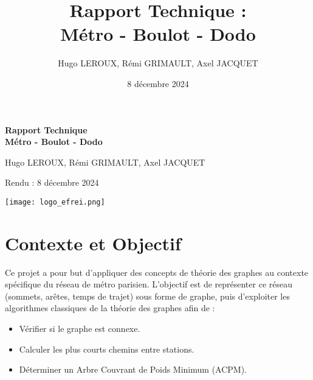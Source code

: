 \documentclass[a4paper,12pt]{article}
\title{Rapport Technique :\\ Métro - Boulot - Dodo}
\author{Hugo LEROUX, Rémi GRIMAULT, Axel JACQUET}
\date{8 décembre 2024}
\begin{document}
\begin{titlepage}
    \thispagestyle{empty} %
    \begin{center}
        \vspace*{\fill}
        {\huge \bfseries Rapport Technique\\Métro - Boulot - Dodo\par}
        \vspace{1cm}
\begin{center}
\end{center}
        \vspace{1cm}
        {\Large Hugo LEROUX, Rémi GRIMAULT, Axel JACQUET\par}
        \vspace{0.5cm}
        {\Large Rendu : 8 décembre 2024\par}
        \vspace*{\fill}
    \end{center}
    
    \vspace*{\fill}
    \noindent\texttt{[image: logo\_efrei.png]}\hfill \the{}
    \vspace{0.5cm}
\end{titlepage}

\clearpage
\tableofcontents
\clearpage

\section{Contexte et Objectif}

Ce projet a pour but d'appliquer des concepts de théorie des graphes au contexte spécifique du réseau de métro parisien. L’objectif est de représenter ce réseau (sommets, arêtes, temps de trajet) sous forme de graphe, puis d’exploiter les algorithmes classiques de la théorie des graphes afin de :
\begin{itemize}
    \item Vérifier si le graphe est connexe.
    \item Calculer les plus courts chemins entre stations.
    \item Déterminer un Arbre Couvrant de Poids Minimum (ACPM).
\end{itemize}
\end{document}
